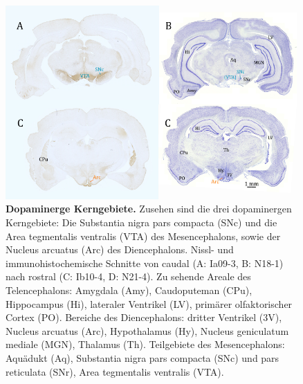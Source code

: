 \documentclass[12pt,a4paper,pdftex]{article}
\begin{document}
\begin{figure}[H]
    \centering
    \includegraphics[width=\textwidth]{pictures/Bilder_monoamine_systeme/dopaminerge_kerne.png}
    \caption[Dopaminerge Kerngebiete]{\textbf{Dopaminerge Kerngebiete.} Zusehen sind die drei dopaminergen Kerngebiete: Die Substantia nigra pars compacta (SNc) und die Area tegmentalis ventralis (VTA) des Mesencephalons, sowie der Nucleus arcuatus (Arc) des Diencephalons. Nissl- und immunohistochemische Schnitte von caudal (A: Ia09-3, B: N18-1) nach rostral (C: Ib10-4, D: N21-4). Zu sehende Areale des Telencephalons: Amygdala (Amy), Caudoputeman (CPu), Hippocampus (Hi), lateraler Ventrikel (LV), primärer olfaktorischer Cortex (PO). Bereiche des Diencephalons: dritter Ventrikel (3V), Nucleus arcuatus (Arc), Hypothalamus (Hy), Nucleus geniculatum mediale (MGN), Thalamus (Th). Teilgebiete des Mesencephalons: Aquädukt (Aq), Substantia nigra pars compacta (SNc) und pars reticulata (SNr), Area tegmentalis ventralis (VTA).}
    \label{fig:dopaminerge_kerngebiete}
\end{figure}{}
\end{document}
